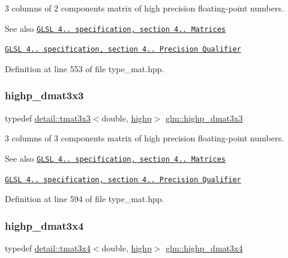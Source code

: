 3 columns of 2 components matrix of high precision floating-\/point numbers.

\begin{DoxySeeAlso}{See also}
\href{http://www.opengl.org/registry/doc/GLSLangSpec.4.20.8.pdf}{\tt G\+L\+SL 4.. specification, section 4.. Matrices} 

\href{http://www.opengl.org/registry/doc/GLSLangSpec.4.20.8.pdf}{\tt G\+L\+SL 4.. specification, section 4.. Precision Qualifier} 
\end{DoxySeeAlso}


Definition at line 553 of file type\+\_\+mat.\+hpp.

\mbox{\label{group__core__precision_gad7229dea82287910d88e6e8566e39fc7}} 
\subsubsection{\texorpdfstring{highp\+\_\+dmat3x3}{highp\_dmat3x3}}
{\footnotesize\ttfamily typedef \hyperlink{structglm_1_1detail_1_1tmat3x3}{detail\+::tmat3x3}$<$double, \hyperlink{namespaceglm_a0f04f086094c747d227af4425893f545ac6f7eab42eacbb10d59a58e95e362074}{highp}$>$ \hyperlink{group__core__precision_gad7229dea82287910d88e6e8566e39fc7}{glm\+::highp\+\_\+dmat3x3}}

3 columns of 3 components matrix of high precision floating-\/point numbers.

\begin{DoxySeeAlso}{See also}
\href{http://www.opengl.org/registry/doc/GLSLangSpec.4.20.8.pdf}{\tt G\+L\+SL 4.. specification, section 4.. Matrices} 

\href{http://www.opengl.org/registry/doc/GLSLangSpec.4.20.8.pdf}{\tt G\+L\+SL 4.. specification, section 4.. Precision Qualifier} 
\end{DoxySeeAlso}


Definition at line 594 of file type\+\_\+mat.\+hpp.

\mbox{\label{group__core__precision_gaff199c8d04a8edb92ed43283e8694c59}} 
\subsubsection{\texorpdfstring{highp\+\_\+dmat3x4}{highp\_dmat3x4}}
{\footnotesize\ttfamily typedef \hyperlink{structglm_1_1detail_1_1tmat3x4}{detail\+::tmat3x4}$<$double, \hyperlink{namespaceglm_a0f04f086094c747d227af4425893f545ac6f7eab42eacbb10d59a58e95e362074}{highp}$>$ \hyperlink{group__core__precision_gaff199c8d04a8edb92ed43283e8694c59}{glm\+::highp\+\_\+dmat3x4}}

